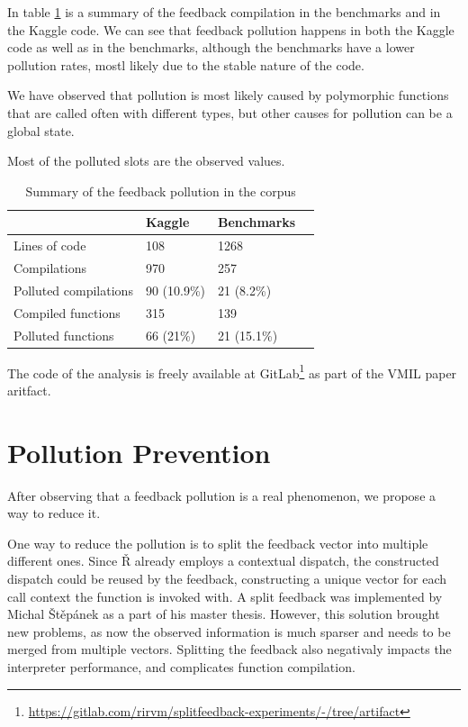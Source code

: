 In table \ref{tbl:pollution-summary} is a summary of the feedback compilation in the benchmarks and in the Kaggle code. We can see that feedback pollution happens in both the Kaggle code as well as in the benchmarks, although the benchmarks have a lower pollution rates, mostl likely due to the stable nature of the code.

We have observed that pollution is most likely caused by polymorphic functions that are called often with different types, but other causes for pollution can be a global state.

Most of the polluted slots are the observed values.

\begin{table}[H]
	\centering
	\begin{tabular}{llll}
		\hline
		                      & Kaggle      & Benchmarks  \\
		\hline
		Lines of code         & 108         & 1268        \\
		Compilations          & 970         & 257         \\
		Polluted compilations & 90 (10.9\%) & 21 (8.2\%)  \\
		Compiled functions    & 315         & 139         \\
		Polluted functions    & 66 (21\%)   & 21 (15.1\%) \\
		\hline
	\end{tabular}
  \caption{Summary of the feedback pollution in the corpus\cite{feedback-vmil}}\label{tbl:pollution-summary}
\end{table}


The code of the analysis is freely available at GitLab\footnote{\url{https://gitlab.com/rirvm/splitfeedback-experiments/-/tree/artifact}} as part of the VMIL paper\cite{feedback-vmil} aritfact.

\section{Pollution Prevention}

After observing that a feedback pollution is a real phenomenon, we propose a way to reduce it.

One way to reduce the pollution is to split the feedback vector into multiple different ones. Since Ř already employs a contextual dispatch, the constructed dispatch could be reused by the feedback, constructing a unique vector for each call context the function is invoked with. A split feedback was implemented by Michal Štěpánek as a part of his master thesis\cite{michal2025obohaceny}. However, this solution brought new problems, as now the observed information is much sparser and needs to be merged from multiple vectors. Splitting the feedback also negativaly impacts the interpreter performance, and complicates function compilation.


